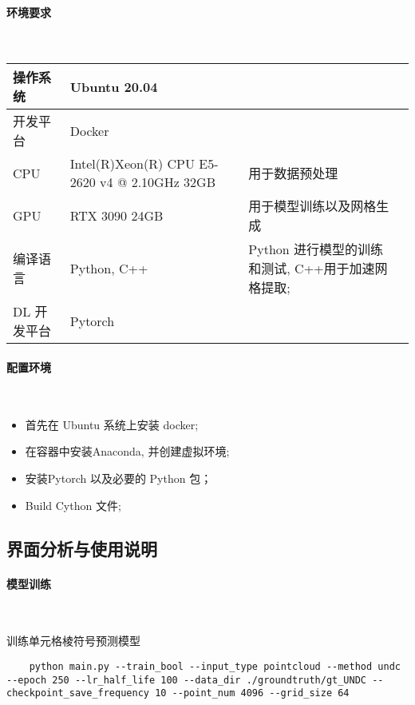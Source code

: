 \paragraph{环境要求}~{}

\begin{table}[h]
\renewcommand\arraystretch{1.5}
    \centering
    \begin{tabularx}{\textwidth}{X X X X}
        \hline
		操作系统 	& Ubuntu 20.04 	& \\
		\hline
		开发平台 	& Docker			& \\
		\hline
		CPU 		& Intel(R)Xeon(R) CPU E5-2620 v4 @ 2.10GHz 32GB & 用于数据预处理 \\
		\hline
		GPU 		& RTX 3090 24GB		& 用于模型训练以及网格生成 \\
		\hline
		编译语言 	& Python, C++ 		& Python 进行模型的训练和测试, C++用于加速网格提取; \\
		\hline
		DL 开发平台 & Pytorch 		& \\
		\hline
    \end{tabularx}
\end{table}

\paragraph{配置环境}~{}

\begin{itemize}
	\item 首先在 Ubuntu 系统上安装 docker;
	\item 在容器中安装Anaconda, 并创建虚拟环境;
	\item 安装Pytorch 以及必要的 Python 包；
	\item Build Cython 文件;
\end{itemize}

\subsection{界面分析与使用说明}

\paragraph{模型训练}~{}

训练单元格棱符号预测模型

\lstset{language=bash}
\begin{lstlisting}
    python main.py --train_bool --input_type pointcloud --method undc --epoch 250 --lr_half_life 100 --data_dir ./groundtruth/gt_UNDC --checkpoint_save_frequency 10 --point_num 4096 --grid_size 64 
\end{lstlisting}

